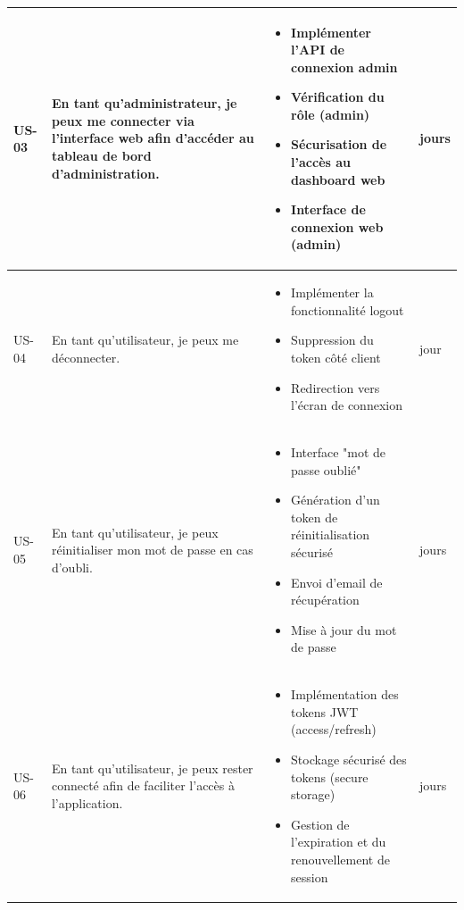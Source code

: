 \begin{longtable}{|>{\centering\arraybackslash}p{}|>{\raggedright\arraybackslash}p{}|>{\raggedright\arraybackslash}p{}|>{\centering\arraybackslash}p{}|}
US-03 & En tant qu'administrateur, je peux me connecter via l'interface web afin d'accéder au tableau de bord d'administration.
& \begin{itemize}[leftmargin=*, nosep]
\item Implémenter l'API de connexion admin
\item Vérification du rôle (admin)
\item Sécurisation de l'accès au dashboard web
\item Interface de connexion web (admin)
\end{itemize}
& 2 jours \\ \hline

US-04 & En tant qu'utilisateur, je peux me déconnecter.
& \begin{itemize}[leftmargin=*, nosep]
\item Implémenter la fonctionnalité logout
\item Suppression du token côté client
\item Redirection vers l'écran de connexion
\end{itemize}
& 1 jour \\ \hline

US-05 & En tant qu'utilisateur, je peux réinitialiser mon mot de passe en cas d'oubli.
& \begin{itemize}[leftmargin=*, nosep]
\item Interface "mot de passe oublié"
\item Génération d'un token de réinitialisation sécurisé
\item Envoi d'email de récupération
\item Mise à jour du mot de passe
\end{itemize}
& 2 jours \\ \hline

US-06 & En tant qu'utilisateur, je peux rester connecté afin de faciliter l'accès à l'application.
& \begin{itemize}[leftmargin=*, nosep]
\item Implémentation des tokens JWT (access/refresh)
\item Stockage sécurisé des tokens (secure storage)
\item Gestion de l'expiration et du renouvellement de session
\end{itemize}
& 2 jours \\ \hline


\end{longtable}
